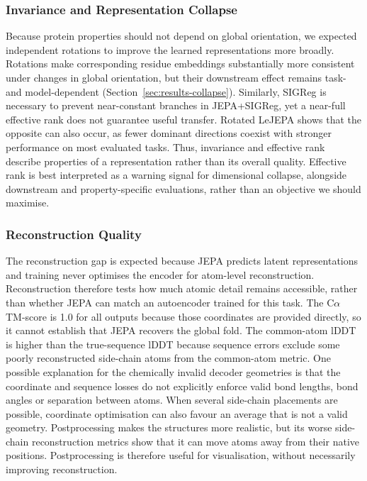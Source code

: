 \subsubsection{Invariance and Representation Collapse}

Because protein properties should not depend on global orientation, we expected independent rotations to improve the learned representations more broadly. Rotations make corresponding residue embeddings substantially more consistent under changes in global orientation, but their downstream effect remains task- and model-dependent (Section~\ref{sec:results-collapse}). Similarly, SIGReg is necessary to prevent near-constant branches in JEPA+SIGReg, yet a near-full effective rank does not guarantee useful transfer. Rotated LeJEPA shows that the opposite can also occur, as fewer dominant directions coexist with stronger performance on most evaluated tasks. Thus, invariance and effective rank describe properties of a representation rather than its overall quality. Effective rank is best interpreted as a warning signal for dimensional collapse, alongside downstream and property-specific evaluations, rather than an objective we should maximise.

\subsubsection{Reconstruction Quality}

The reconstruction gap is expected because JEPA predicts latent representations and training never optimises the encoder for atom-level reconstruction. Reconstruction therefore tests how much atomic detail remains accessible, rather than whether JEPA can match an autoencoder trained for this task. The C$\alpha$ TM-score is 1.0 for all outputs because those coordinates are provided directly, so it cannot establish that JEPA recovers the global fold. The common-atom lDDT is higher than the true-sequence lDDT because sequence errors exclude some poorly reconstructed side-chain atoms from the common-atom metric. One possible explanation for the chemically invalid decoder geometries is that the coordinate and sequence losses do not explicitly enforce valid bond lengths, bond angles or separation between atoms. When several side-chain placements are possible, coordinate optimisation can also favour an average that is not a valid geometry. Postprocessing makes the structures more realistic, but its worse side-chain reconstruction metrics show that it can move atoms away from their native positions. Postprocessing is therefore useful for visualisation, without necessarily improving reconstruction.

